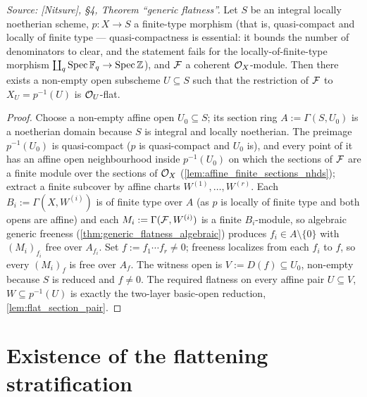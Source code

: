 \begin{theorem}
  \leanok
  \label{thm:generic_flatness}
  \textit{Source: [Nitsure], \S4, Theorem ``generic flatness''.}
  Let \(S\) be an integral locally noetherian scheme, \(p : X \to S\) a
  finite-type morphism (that is, quasi-compact and locally of finite type —
  quasi-compactness is essential: it bounds the number of denominators to
  clear, and the statement fails for the locally-of-finite-type morphism
  \(\coprod_q \operatorname{Spec} \mathbb{F}_q \to \operatorname{Spec} \mathbb{Z}\)), and \(\mathcal{F}\) a coherent
  \(\mathcal{O}_X\)-module. Then there exists a non-empty open subscheme
  \(U \subseteq S\) such that the restriction of \(\mathcal{F}\) to
  \(X_U = p^{-1}(U)\) is \(\mathcal{O}_U\)-flat.
\end{theorem}

\begin{proof}
  \leanok
  Choose a non-empty affine open \(U_0 \subseteq S\); its section ring
  \(A := \Gamma(S, U_0)\) is a noetherian domain because \(S\) is integral and
  locally noetherian. The preimage \(p^{-1}(U_0)\) is quasi-compact
  (\(p\) is quasi-compact and \(U_0\) is), and every point of it has an
  affine open neighbourhood inside \(p^{-1}(U_0)\) on which the sections of
  \(\mathcal{F}\) are a finite module over the sections of \(\mathcal{O}_X\)
  (\cref{lem:affine_finite_sections_nhds}); extract a finite subcover by
  affine charts \(W^{(1)}, \dots, W^{(r)}\). Each
  \(B_i := \Gamma(X, W^{(i)})\) is of finite type over \(A\) (as \(p\) is
  locally of finite type and both opens are affine) and each
  \(M_i := \Gamma(\mathcal{F}, W^{(i)})\) is a finite \(B_i\)-module, so algebraic
  generic freeness (\cref{thm:generic_flatness_algebraic}) produces
  \(f_i \in A \setminus \{0\}\) with \((M_i)_{f_i}\) free over \(A_{f_i}\).
  Set \(f := f_1 \cdots f_r \ne 0\); freeness localizes from each \(f_i\) to
  \(f\), so every \((M_i)_f\) is free over \(A_f\). The witness open is
  \(V := D(f) \subseteq U_0\), non-empty because \(S\) is reduced and
  \(f \ne 0\). The required flatness on every affine pair
  \(U \subseteq V\), \(W \subseteq p^{-1}(U)\) is exactly the two-layer
  basic-open reduction, \cref{lem:flat_section_pair}.
\end{proof}

\section{Existence of the flattening stratification}
\label{sec:flatstrat_exists}

